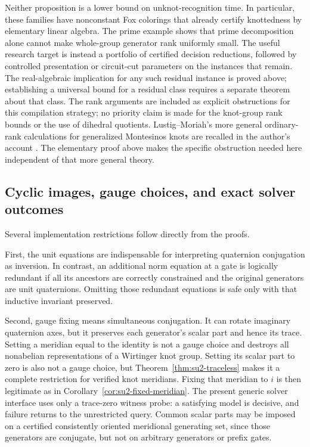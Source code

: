 Neither proposition is a lower bound on unknot-recognition time.  In
particular, these families have nonconstant Fox colorings that already
certify knottedness by elementary linear algebra.  The prime example
shows that prime decomposition alone cannot make whole-group generator
rank uniformly small.  The useful research target is instead a
portfolio of certified decision reductions, followed by controlled
presentation or circuit-cut parameters on the instances that remain.
The real-algebraic implication for any such residual instance is proved
above; establishing a universal bound for a residual class requires a
separate theorem about that class.
The rank arguments are included as explicit obstructions for this
compilation strategy; no priority claim is made for the knot-group rank
bounds or the use of dihedral quotients.  Lustig--Moriah's more general
ordinary-rank calculations for generalized Montesinos knots
\cite{LustigMoriah1993} are recalled in the author's account
\cite[Theorem~3.6]{Moriah2007}.  The elementary proof above makes the
specific obstruction needed here independent of that more general theory.

\subsection{Cyclic images, gauge choices, and exact solver outcomes}

Several implementation restrictions follow directly from the proofs.

First, the unit equations are indispensable for interpreting quaternion
conjugation as inversion.  In contrast, an additional norm equation at a
gate is logically redundant if all its ancestors are correctly constrained
and the original generators are unit quaternions.  Omitting those redundant
equations is safe only with that inductive invariant preserved.

Second, gauge fixing means simultaneous conjugation.  It can rotate
imaginary quaternion axes, but it preserves each generator's scalar part
and hence its trace. Setting a meridian equal to the identity is not a
gauge choice and destroys all nonabelian representations of a Wirtinger
knot group. Setting its scalar part to zero is also not a gauge choice,
but Theorem~\ref{thm:su2-traceless} makes it a complete restriction for
verified knot meridians. Fixing that meridian to $i$ is then legitimate
as in Corollary~\ref{cor:su2-fixed-meridian}. The present generic
solver interface uses only a trace-zero witness probe: a satisfying
model is decisive, and failure returns to the unrestricted query.
Common scalar parts may be imposed on a
certified consistently oriented meridional generating set, since those
generators are conjugate, but not on arbitrary generators or prefix gates.

